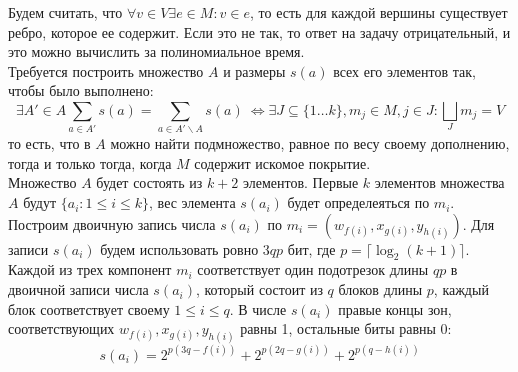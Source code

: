\documentclass[10pt]{article}
\begin{document}
\begin{enumerate}
    Будем считать, что $\forall v \in V \exists e \in M: v \in e$, то есть для каждой вершины существует ребро, которое ее содержит. Если это не так, то ответ на задачу отрицательный, и это можно вычислить за полиномиальное время. \\
    Требуется построить множество $A$ и размеры $s(a)$ всех его элементов так, чтобы было выполнено: 
    \begin{equation}
        \exists A' \in A \sum_{a \in A'} s(a) = \sum_{a \in A' \backslash A} s(a) \
        \iff \exists J \subseteq \{1\dots k\}, m_{j} \in M, j \in J : \bigsqcup_{J} m_j = V
    \end{equation}
    то есть, что в $A$ можно найти подмножество, равное по весу своему дополнению, тогда и только тогда, когда $M$ содержит искомое покрытие. \\
    Множество $A$ будет состоять из $k+2$ элементов. Первые $k$ элементов множества $A$ будут $\{ a_i: 1 \leq i \leq k\}$, вес элемента $s(a_i)$ будет определеяться по $m_i$. Построим двоичную запись числа $s(a_i)$ по $m_i = (w_{f(i)},x_{g(i)},y_{h(i)})$. Для записи $s(a_i)$ будем использовать ровно $3qp$ бит, где $p = \lceil \log_2{(k+1)} \rceil$. Каждой из трех компонент $m_i$ соответствует один подотрезок длины $qp$ в двоичной записи числа $s(a_i)$, который состоит из $q$ блоков длины $p$, каждый блок соответствует своему $1 \leq i \leq q$. В числе $s(a_i)$ правые концы зон, соответствующих $w_{f(i)}, x_{g(i)}, y_{h(i)}$ равны 1, остальные биты равны 0:
    \begin{equation}
        s(a_i) = 2^{p(3q - f(i))} + 2^{p(2q - g(i))} + 2^{p(q - h(i))}
    \end{equation}


\end{enumerate}
\end{document}
